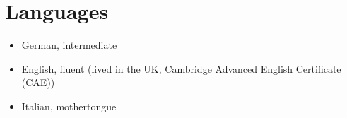 \documentclass[letterpaper]{twentysecondcv} %
\begin{document}
\section{Languages}

\begin{itemize}
    \item German, intermediate
    \item English, fluent (lived in the UK, Cambridge Advanced English Certificate (CAE))
    \item Italian, mothertongue
\end{itemize}
\end{document}
